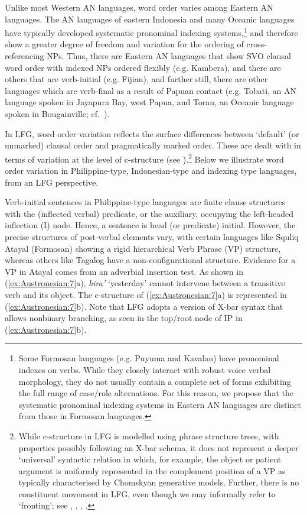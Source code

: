 \documentclass[output=paper,chinesefont]{../langscibook}
\begin{document}
Unlike most Western AN languages, word order varies among Eastern AN languages. The AN languages of eastern Indonesia and many Oceanic languages have typically developed systematic pronominal indexing systems,\footnote{Some Formosan languages (e.g. Puyuma and Kavalan) have pronominal indexes on verbs. While they closely interact with robust voice verbal morphology, they do not usually contain a complete set of forms exhibiting the full range of case/role alternations. For this reason, we propose that the systematic pronominal indexing systems in Eastern AN languages are distinct from those in Formosan languages.} and therefore show a greater degree of freedom and variation for the ordering of cross-referencing NPs. Thus, there are Eastern AN languages that show SVO clausal word order with indexed NPs ordered flexibly (e.g. Kambera), and there are others that are verb-initial (e.g. Fijian), and further still, there are other languages which are verb-final as a result of Papuan contact (e.g. Tobati, an AN language spoken in Jayapura Bay, west Papua, and Torau, an Oceanic language spoken in Bougainville; cf.\ \citealt{Lynch2002}).

In LFG, word order variation reflects the surface differences between `default' (or unmarked) clausal order and pragmatically marked order. These are dealt with in terms of variation at the level of c-structure (see ).\footnote{While c-structure in LFG is modelled using phrase structure trees, with properties possibly following an X-bar schema, it does not represent a deeper `universal' syntactic relation in which, for example, the
object or patient argument is uniformly represented in the complement position of a VP as typically characterised by Chomskyan generative models. Further, there is no constituent movement in LFG, even though we may informally refer to `fronting'; see \citet{bresnan1982introduction}, \citet[chapter~6]{BresnanEtAl2016}, \citet[chapter~3]{DLM:LFG}, .}  Below we illustrate word order variation in Philippine-type, Indonesian-type and indexing type languages, from an LFG perspective.

Verb-initial sentences in Philippine-type languages are finite clause structures with the (inflected verbal) predicate, or the auxiliary, occupying the left-headed inflection (I) node. Hence, a sentence is head (or predicate) initial. However, the precise structures of post-verbal elements vary, with certain languages like Squliq Atayal (Formosan) showing a rigid hierarchical Verb Phrase (VP) structure, whereas others like Tagalog have a non-configurational structure. Evidence for a VP in Atayal comes from an adverbial insertion test. As shown in (\ref{ex:Austronesian:7}a), \emph{hira'} `yesterday' cannot intervene between a transitive verb and its object. The c-structure of (\ref{ex:Austronesian:7}a) is represented in (\ref{ex:Austronesian:7}b). Note that LFG adopts a version of X-bar syntax that allows nonbinary branching, as seen in the top/root node of IP in (\ref{ex:Austronesian:7}b).
\end{document}
